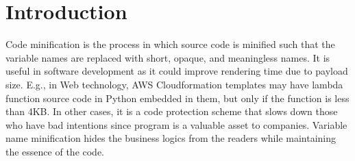\section{Introduction}
\label{intro:sec}




Code minification is the process in which source code is minified such
that the variable names are replaced with short, opaque, and
meaningless names. It is useful in software development as it could
improve rendering time due to payload size. E.g., in Web
technology, AWS Cloudformation templates may have lambda function
source code in Python embedded in them, but only if the function is
less than 4KB. In other cases, it is a code protection scheme that
slows down those who have bad intentions since program is a valuable
asset to companies. Variable name minification hides the
business logics from the readers while maintaining the essence of the
code.





